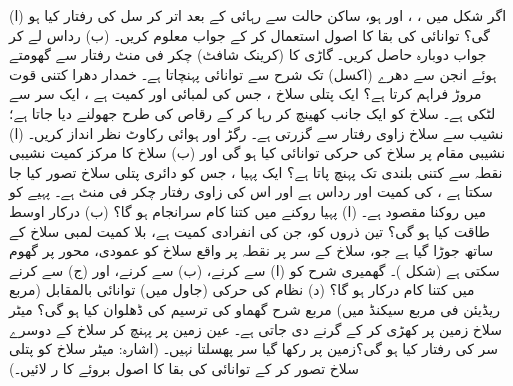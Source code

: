 (ا)  اگر شکل  میں ، ، اور  ہو،  ساکن حالت سے رہائی کے بعد     اتر کر  سل کی رفتار  کیا ہو گی؟ توانائی کی بقا کا اصول استعمال کر کے جواب معلوم کریں۔ (ب) رداس  لے کر جواب دوبارہ حاصل کریں۔
گاڑی کا  (کرینک شافٹ)   چکر فی منٹ رفتار سے گھومتے ہوئے  انجن سے دھرے  (اکسل) تک  شرح سے   توانائی  پہنچاتا ہے۔ خمدار دھرا کتنی قوت مروڑ فراہم کرتا ہے؟
ایک پتلی سلاخ ، جس کی لمبائی  اور کمیت  ہے ، ایک سر سے لٹکی ہے۔ سلاخ کو ایک جانب کھینچ کر  رہا کر کے رقاص کی طرح  جھولنے  دیا جاتا  ہے؛ نشیب سے سلاخ  زاوی رفتار سے گزرتی ہے۔ رگڑ اور ہوائی رکاوٹ نظر انداز کریں۔ (ا)  نشیبی مقام پر سلاخ کی حرکی توانائی کیا ہو گی  اور (ب)  سلاخ کا مرکز کمیت  نشیبی نقطہ سے کتنی بلندی تک پہنچ پاتا ہے؟
ایک پہیا ، جس کو   دائری پتلی  سلاخ  تصور کیا جا سکتا ہے ، کی کمیت   اور  رداس  ہے  اور  اس کی زاوی رفتار   چکر فی منٹ ہے۔ پہیے کو  میں  روکنا مقصود ہے۔ (ا)  پہیا روکنے میں کتنا کام سرانجام ہو گا؟ (ب) درکار اوسط طاقت کیا ہو گی؟
تین ذروں کو، جن کی انفرادی کمیت  ہے، بلا کمیت    لمبی سلاخ کے ساتھ جوڑا گیا ہے جو، سلاخ کے  سر پر نقطہ    پر واقع  سلاخ کو عمودی،  محور پر گھوم سکتی ہے (شکل )۔ گھمیری  شرح  کو (ا)    سے  کرنے، (ب)    سے  کرنے، اور (ج)   سے  کرنے میں کتنا کام درکار ہو گا؟ (د)   نظام کی حرکی (جاول میں)  توانائی   بالمقابل   (مربع ریڈیئن فی مربع سیکنڈ میں)  مربع   شرح گھماو کی ترسیم  کی  ڈھلوان  کیا ہو گی؟
میٹر سلاخ زمین پر کھڑی کر کے گرنے دی جاتی ہے۔ عین زمین پر پہنچ کر سلاخ کے دوسرے سر کی رفتار کیا ہو گی؟زمین پر رکھا گیا سر پھسلتا نہیں۔ (اشارہ: میٹر سلاخ کو پتلی سلاخ تصور کر کے توانائی کی بقا کا اصول بروئے کا ر لائیں۔)
